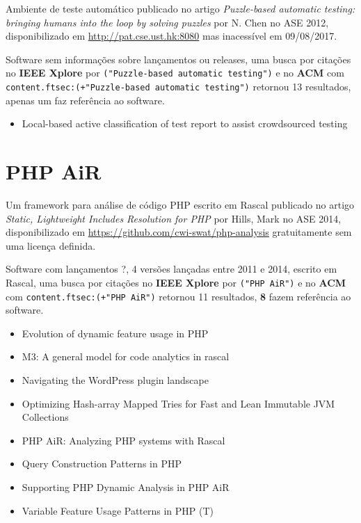 Ambiente de teste automático
publicado no artigo {\it Puzzle-based automatic testing: bringing humans into the loop by solving puzzles}
por N. Chen
no ASE 2012,
disponibilizado em \url{http://pat.cse.ust.hk:8080}
mas inacessível em 09/08/2017.

Software sem informações sobre lançamentos ou releases,
uma busca por citações no {\bf IEEE Xplore} por
\texttt{("Puzzle-based automatic testing")}
e no {\bf ACM} com
\texttt{content.ftsec:(+"Puzzle-based automatic testing")}
retornou
13 resultados,
apenas um faz referência ao software.

\begin{itemize}
\item Local-based active classification of test report to assist crowdsourced testing
\end{itemize}

\section{PHP AiR}

Um framework para análise de código PHP escrito em Rascal
publicado no artigo {\it Static, Lightweight Includes Resolution for PHP}
por Hills, Mark
no ASE 2014,
disponibilizado em \url{https://github.com/cwi-swat/php-analysis}
gratuitamente
sem uma licença definida.

Software com lançamentos ?,
4 versões lançadas
entre 2011 e 2014,
escrito em Rascal,
uma busca por citações no {\bf IEEE Xplore} por
\texttt{("PHP AiR")}
e no {\bf ACM} com
\texttt{content.ftsec:(+"PHP AiR")}
retornou
11 resultados,
{\bf 8} fazem referência ao software.

\begin{itemize}
\item Evolution of dynamic feature usage in PHP
\item M3: A general model for code analytics in rascal
\item Navigating the WordPress plugin landscape
\item Optimizing Hash-array Mapped Tries for Fast and Lean Immutable JVM Collections
\item PHP AiR: Analyzing PHP systems with Rascal
\item Query Construction Patterns in PHP
\item Supporting PHP Dynamic Analysis in PHP AiR
\item Variable Feature Usage Patterns in PHP (T)
\end{itemize}

